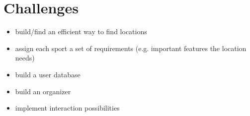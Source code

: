 \documentclass[aspectratio=169]{beamer}
\begin{document}






\section{Challenges}
\begin{frame}
	\begin{itemize}
		\item build/find an efficient way to find locations
		\item assign each sport a set of requirements (e.g. important features the location needs)
		\item build a user database
		\item build an organizer 
		\item implement interaction possibilities
	\end{itemize}
\end{frame}
\end{document}
